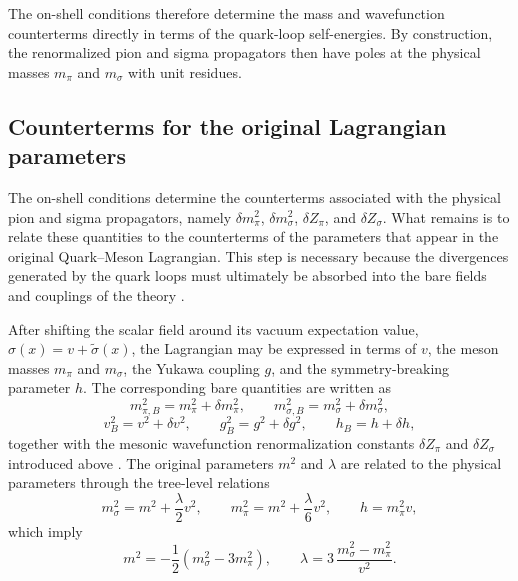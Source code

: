The on-shell conditions therefore determine the mass and
wavefunction counterterms directly in terms of the quark-loop
self-energies. By construction, the renormalized pion and sigma
propagators then have poles at the physical masses \(m_\pi\) and
\(m_\sigma\) with unit residues.

\subsection*{Counterterms for the original Lagrangian parameters}

The on-shell conditions determine the counterterms associated with the
physical pion and sigma propagators, namely \(\delta m_\pi^2\),
\(\delta m_\sigma^2\), \(\delta Z_\pi\), and \(\delta Z_\sigma\).
What remains is to relate these quantities to the counterterms of the
parameters that appear in the original Quark--Meson Lagrangian. This
step is necessary because the divergences generated by the quark loops
must ultimately be absorbed into the bare fields and couplings of the
theory \cite{Folkestad2018,Andersen2024}.

After shifting the scalar field around its vacuum expectation value,
\(\sigma(x)=v+\tilde{\sigma}(x)\), the Lagrangian may be expressed in
terms of \(v\), the meson masses \(m_\pi\) and \(m_\sigma\), the Yukawa
coupling \(g\), and the symmetry-breaking parameter \(h\). The
corresponding bare quantities are written as
\begin{equation}
m_{\pi,B}^2 = m_\pi^2 + \delta m_\pi^2,
\qquad
m_{\sigma,B}^2 = m_\sigma^2 + \delta m_\sigma^2,
\end{equation}
\begin{equation}
v_B^2 = v^2 + \delta v^2,
\qquad
g_B^2 = g^2 + \delta g^2,
\qquad
h_B = h + \delta h ,
\end{equation}
together with the mesonic wavefunction renormalization constants
\(\delta Z_\pi\) and \(\delta Z_\sigma\) introduced above
\cite{Folkestad2018}. The original parameters \(m^2\) and \(\lambda\) 
are related to the physical parameters through the tree-level relations
\begin{equation}
m_\sigma^2 = m^2 + \frac{\lambda}{2}v^2,
\qquad
m_\pi^2 = m^2 + \frac{\lambda}{6}v^2,
\qquad
h = m_\pi^2 v ,
\label{eq:qm_tree_relations_shifted}
\end{equation}
which imply
\begin{equation}
m^2 = -\frac{1}{2}\left(m_\sigma^2 - 3m_\pi^2\right),
\qquad
\lambda = 3\,\frac{m_\sigma^2-m_\pi^2}{v^2}.
\label{eq:qm_tree_relations_inverse}
\end{equation}

